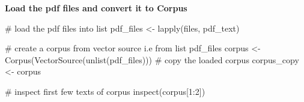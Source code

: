\documentclass[
]{article}
\newenvironment{Shaded}{}{}
\newcommand{\AttributeTok}[1]{#1}
\newcommand{\CommentTok}[1]{\textcolor[rgb]{0.30,0.53,0.42}{#1}}
\newcommand{\DecValTok}[1]{\textcolor[rgb]{0.00,0.00,0.80}{#1}}
\newcommand{\FunctionTok}[1]{#1}
\newcommand{\NormalTok}[1]{#1}
\newcommand{\OtherTok}[1]{\textcolor[rgb]{1.00,0.25,0.00}{#1}}
\newcommand{\SpecialCharTok}[1]{\textcolor[rgb]{0.00,0.50,0.50}{#1}}
\newcommand{\StringTok}[1]{\textcolor[rgb]{0.01,0.42,0.03}{#1}}
\begin{document}
\textbf{Load the pdf files and convert it to Corpus}

\begin{Shaded}
\end{Shaded}

\begin{Shaded}
\begin{Highlighting}[]
\CommentTok{\# load the pdf files into list}
\NormalTok{pdf\_files }\OtherTok{\textless{}{-}} \FunctionTok{lapply}\NormalTok{(files, pdf\_text)}
\end{Highlighting}
\end{Shaded}

\begin{Shaded}
\begin{Highlighting}[]
\CommentTok{\# create a corpus from vector source i.e from list pdf\_files}
\NormalTok{corpus }\OtherTok{\textless{}{-}} \FunctionTok{Corpus}\NormalTok{(}\FunctionTok{VectorSource}\NormalTok{(}\FunctionTok{unlist}\NormalTok{(pdf\_files)))}
\CommentTok{\# copy the loaded corpus}
\NormalTok{corpus\_copy }\OtherTok{\textless{}{-}}\NormalTok{ corpus}
\end{Highlighting}
\end{Shaded}

\begin{Shaded}
\begin{Highlighting}[]
\CommentTok{\# inspect first few texts of corpus}
\FunctionTok{inspect}\NormalTok{(corpus[}\DecValTok{1}\SpecialCharTok{:}\DecValTok{2}\NormalTok{])}
\end{Highlighting}
\end{Shaded}
\end{document}
